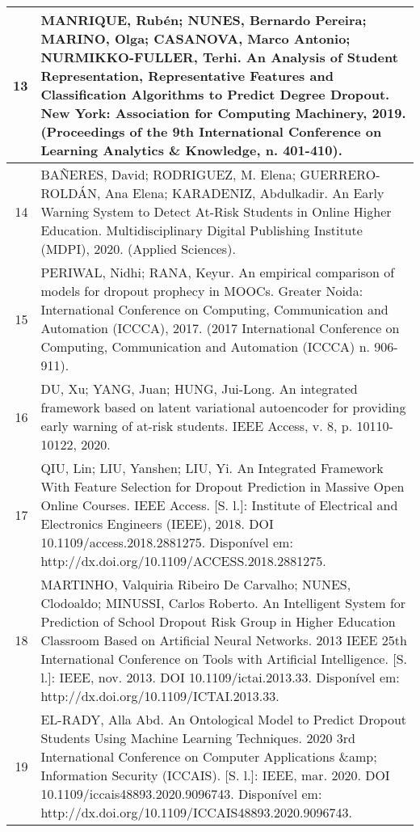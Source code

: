 \begin{apendicesenv}
\begin{longtable}[c]{|r|l|}
13 &
  \multicolumn{1}{p{14.5cm}|}{MANRIQUE, Rubén; NUNES, Bernardo Pereira; MARINO, Olga; CASANOVA, Marco Antonio; NURMIKKO-FULLER, Terhi. An Analysis of Student Representation, Representative Features and Classification Algorithms to Predict Degree Dropout. New York: Association for Computing Machinery, 2019. (Proceedings of the 9th International Conference on Learning Analytics \& Knowledge, n. 401-410).} \\ \hline
14 &
  \multicolumn{1}{p{14.5cm}|}{BAÑERES, David; RODRIGUEZ, M. Elena; GUERRERO-ROLDÁN, Ana Elena; KARADENIZ, Abdulkadir. An Early Warning System to Detect At-Risk Students in Online Higher Education. Multidisciplinary Digital Publishing Institute (MDPI), 2020. (Applied Sciences).} \\ \hline
15 &
  \multicolumn{1}{p{14.5cm}|}{PERIWAL, Nidhi; RANA, Keyur. An empirical comparison of models for dropout prophecy in MOOCs. Greater Noida: International Conference on Computing, Communication and Automation (ICCCA), 2017. (2017 International Conference on Computing, Communication and Automation (ICCCA) n. 906-911).} \\ \hline
16 &
  \multicolumn{1}{p{14.5cm}|}{DU, Xu; YANG, Juan; HUNG, Jui-Long. An integrated framework based on latent variational autoencoder for providing early warning of at-risk students. IEEE Access, v. 8, p. 10110-10122, 2020.} \\ \hline
17 &
  \multicolumn{1}{p{14.5cm}|}{QIU, Lin; LIU, Yanshen; LIU, Yi. An Integrated Framework With Feature Selection for Dropout Prediction in Massive Open Online Courses. IEEE Access. {[}S. l.{]}: Institute of Electrical and Electronics Engineers (IEEE), 2018. DOI 10.1109/access.2018.2881275. Disponível em: http://dx.doi.org/10.1109/ACCESS.2018.2881275.} \\ \hline
18 &
  \multicolumn{1}{p{14.5cm}|}{MARTINHO, Valquiria Ribeiro De Carvalho; NUNES, Clodoaldo; MINUSSI, Carlos Roberto. An Intelligent System for Prediction of School Dropout Risk Group in Higher Education Classroom Based on Artificial Neural Networks. 2013 IEEE 25th International Conference on Tools with Artificial Intelligence. {[}S. l.{]}: IEEE, nov. 2013. DOI 10.1109/ictai.2013.33. Disponível em: http://dx.doi.org/10.1109/ICTAI.2013.33.} \\ \hline
19 &
  \multicolumn{1}{p{14.5cm}|}{EL-RADY, Alla Abd. An Ontological Model to Predict Dropout Students Using Machine Learning Techniques. 2020 3rd International Conference on Computer Applications \&amp; Information Security (ICCAIS). {[}S. l.{]}: IEEE, mar. 2020. DOI 10.1109/iccais48893.2020.9096743. Disponível em: http://dx.doi.org/10.1109/ICCAIS48893.2020.9096743.} \\ \hline

\end{longtable}
\end{apendicesenv}

